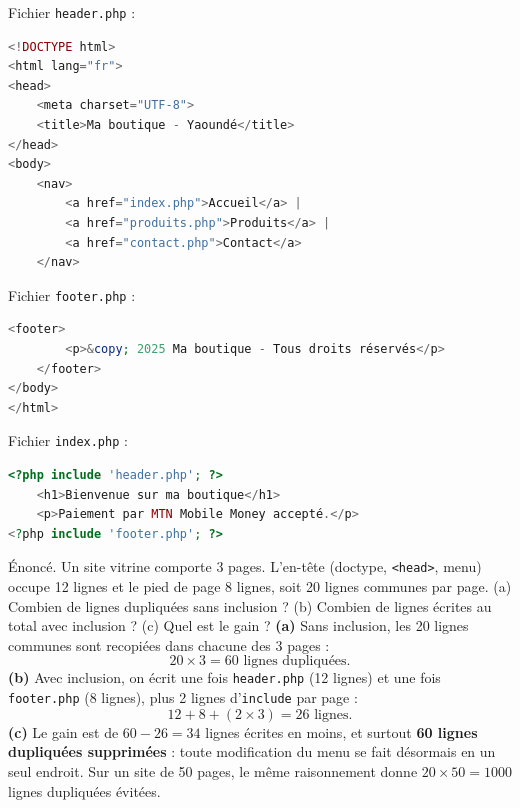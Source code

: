 \documentclass[11pt]{article}
\begin{document}
\begin{exemplebox}
Fichier \texttt{header.php} :
\begin{lstlisting}[language=Php]
<!DOCTYPE html>
<html lang="fr">
<head>
    <meta charset="UTF-8">
    <title>Ma boutique - Yaoundé</title>
</head>
<body>
    <nav>
        <a href="index.php">Accueil</a> |
        <a href="produits.php">Produits</a> |
        <a href="contact.php">Contact</a>
    </nav>
\end{lstlisting}
Fichier \texttt{footer.php} :
\begin{lstlisting}[language=Php]
    <footer>
        <p>&copy; 2025 Ma boutique - Tous droits réservés</p>
    </footer>
</body>
</html>
\end{lstlisting}
Fichier \texttt{index.php} :
\begin{lstlisting}[language=Php]
<?php include 'header.php'; ?>
    <h1>Bienvenue sur ma boutique</h1>
    <p>Paiement par MTN Mobile Money accepté.</p>
<?php include 'footer.php'; ?>
\end{lstlisting}
\end{exemplebox}

\begin{exoresolu}
Énoncé. Un site vitrine comporte 3 pages. L'en-tête (doctype, \texttt{<head>}, menu) occupe 12 lignes et le pied de page 8 lignes, soit 20 lignes communes par page. (a) Combien de lignes dupliquées sans inclusion ? (b) Combien de lignes écrites au total avec inclusion ? (c) Quel est le gain ?
\tcblower
\textbf{(a)} Sans inclusion, les 20 lignes communes sont recopiées dans chacune des 3 pages :
\[ 20 \times 3 = 60 \text{ lignes dupliquées.} \]
\textbf{(b)} Avec inclusion, on écrit une fois \texttt{header.php} (12 lignes) et une fois \texttt{footer.php} (8 lignes), plus 2 lignes d'\texttt{include} par page :
\[ 12 + 8 + (2 \times 3) = 26 \text{ lignes.} \]
\textbf{(c)} Le gain est de $60 - 26 = 34$ lignes écrites en moins, et surtout \textbf{60 lignes dupliquées supprimées} : toute modification du menu se fait désormais en un seul endroit. Sur un site de 50 pages, le même raisonnement donne $20 \times 50 = 1000$ lignes dupliquées évitées.
\end{exoresolu}
\end{document}
